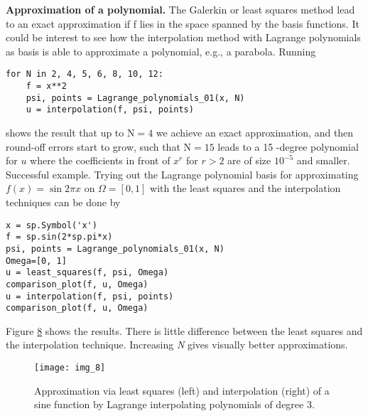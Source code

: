 \documentclass[../main.tex]{subfiles}
\begin{document}
\noindent \textbf{Approximation of a polynomial.} The Galerkin or least squares method lead
to an exact approximation if f lies in the space spanned by the basis functions. It
could be interest to see how the interpolation method with Lagrange polynomials
as basis is able to approximate a polynomial, e.g., a parabola. Running
\begin{lstlisting}[numbers=none]
for N in 2, 4, 5, 6, 8, 10, 12:
	f = x**2
	psi, points = Lagrange_polynomials_01(x, N)
	u = interpolation(f, psi, points)	
\end{lstlisting}
shows the result that up to $\mathrm{N}=4$ we achieve an exact approximation, and then round-off errors start to grow, such that $\mathrm{N}=15$ leads to a 15 -degree polynomial for $u$ where the coefficients in front of $x^{r}$ for $r>2$ are of size $10^{-5}$ and smaller.
Successful example. Trying out the Lagrange polynomial basis for approximating $f(x)=\sin 2 \pi x$ on $\Omega=[0,1]$ with the least squares and the interpolation techniques can be done by
\begin{lstlisting}[numbers=none]
x = sp.Symbol('x')
f = sp.sin(2*sp.pi*x)
psi, points = Lagrange_polynomials_01(x, N)
Omega=[0, 1]
u = least_squares(f, psi, Omega)
comparison_plot(f, u, Omega)
u = interpolation(f, psi, points)
comparison_plot(f, u, Omega)	
\end{lstlisting}
Figure \hyperref[fig:img_8]{8} shows the results. There is little difference between the least squares and
the interpolation technique. Increasing \textit{N} gives visually better approximations.
\begin{figure}[H]
	\centering
	\texttt{[image: img\_8]}
	\caption{Approximation via least squares (left) and interpolation (right) of a
		sine function by Lagrange interpolating polynomials of degree 3.}
	\label{fig:img_8}
\end{figure}	
\end{document}
